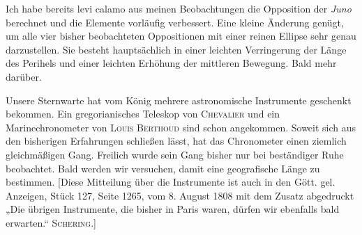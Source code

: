 \par\indent Ich habe bereits levi calamo aus meinen Beobachtungen die Opposition der \emph{Juno} berechnet und die Elemente vorläufig verbessert. Eine kleine Änderung genügt, um alle vier bisher beobachteten Oppositionen mit einer reinen Ellipse sehr genau darzustellen. Sie besteht hauptsächlich in einer leichten Verringerung der Länge des Perihels und einer leichten Erhöhung der mittleren Bewegung. Bald mehr darüber.

\par\indent Unsere Sternwarte hat vom König mehrere astronomische Instrumente geschenkt bekommen. Ein gregorianisches Teleskop von \textsc{Chevalier} und ein Marinechronometer von \textsc{Louis Berthoud} sind schon angekommen. Soweit sich aus den bisherigen Erfahrungen schließen lässt, hat das Chronometer einen ziemlich gleichmäßigen Gang. Freilich wurde sein Gang bisher nur bei beständiger Ruhe beobachtet. Bald werden wir versuchen, damit eine geografische Länge zu bestimmen. [Diese Mitteilung über die Instrumente ist auch in den Gött. gel. Anzeigen, Stück 127, Seite 1265, vom 8. August 1808 mit dem Zusatz abgedruckt „Die übrigen Instrumente, die bisher in Paris waren, dürfen wir ebenfalls bald erwarten.“ \textsc{Schering}.]

